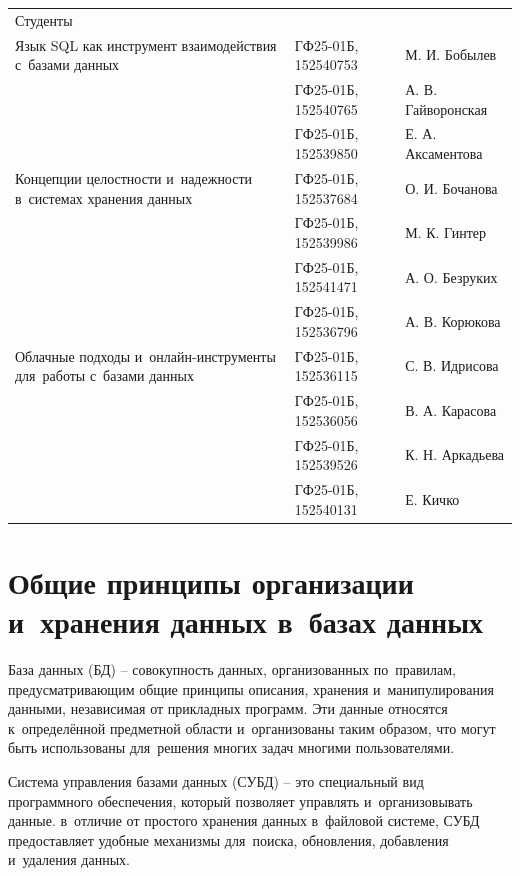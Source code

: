 \documentclass{ou}
\begin{document}
\begin{flushleft}
\doublespacing
\begin{tabularx}{\textwidth}{@{} p{} l l @{}}
Студенты     &                     &         \\
\multirow{-2.27}{\hsize}{\singlespacing Язык SQL как инструмент взаимодействия с~базами данных}
             & ГФ25-01Б, 152540753 & М. И. Бобылев\\
             & ГФ25-01Б, 152540765 & А. В. Гайворонская\\
             & ГФ25-01Б, 152539850 & Е. А. Аксаментова\\
\multirow{-2.27}{\hsize}{\singlespacing Концепции целостности и~надежности в~системах хранения данных}
             & ГФ25-01Б, 152537684 & О. И. Бочанова\\
             & ГФ25-01Б, 152539986 & М. К. Гинтер\\
             & ГФ25-01Б, 152541471 & А. О. Безруких\\
             & ГФ25-01Б, 152536796 & А. В. Корюкова\\
\multirow{-2.27}{\hsize}{\singlespacing Облачные подходы и~онлайн-инструменты для~работы с~базами данных}
             & ГФ25-01Б, 152536115 & С. В. Идрисова\\
             & ГФ25-01Б, 152536056 & В. А. Карасова\\
             & ГФ25-01Б, 152539526 & К. Н. Аркадьева\\
             & ГФ25-01Б, 152540131 & Е. Кичко\\
\end{tabularx}
\end{flushleft}
\newpage
\tableofcontents
\newpage
\onehalfspacing
\section{Общие принципы организации и~хранения данных в~базах данных}
База данных (БД) -- совокупность данных, организованных по~правилам, предусматривающим общие принципы описания, хранения и~манипулирования данными, независимая от прикладных программ. Эти данные относятся к~определённой предметной области и~организованы таким образом, что могут быть использованы для~решения многих задач многими пользователями. 

Система управления базами данных (СУБД) -- это специальный вид программного обеспечения, который позволяет управлять и~организовывать данные. в~отличие от простого хранения данных в~файловой системе, СУБД предоставляет удобные механизмы для~поиска, обновления, добавления и~удаления данных. 
\end{document}
